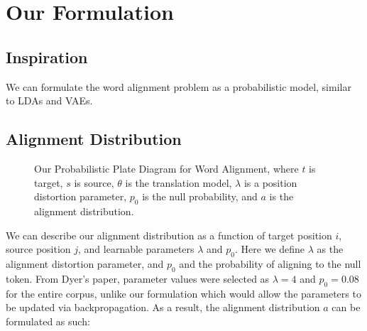\documentclass[twoside,twocolumn]{article}
\begin{document}
\section{Our Formulation}

\subsection{Inspiration}
We can formulate the word alignment problem as a probabilistic model, similar to LDAs and VAEs.

\subsection{Alignment Distribution}

\begin{figure}
\centering
{}
\caption{Our Probabilistic Plate Diagram for Word Alignment, where $t$ is target, $s$ is source, $\theta$ is the translation model, $\lambda$ is a position distortion parameter, $p_0$ is the null probability, and $a$ is the alignment distribution.}
\end{figure}

We can describe our alignment distribution as a function of target position $i$, source position $j$, and learnable parameters $\lambda$ and $p_0$. Here we define $\lambda$ as the alignment distortion parameter, and $p_0$ and the probability of aligning to the null token. From Dyer's paper, parameter values were selected as $\lambda=4$ and $p_0=0.08$ for the entire corpus, unlike our formulation which would allow the parameters to be updated via backpropagation. As a result, the alignment distribution $a$ can be formulated as such:
\end{document}

